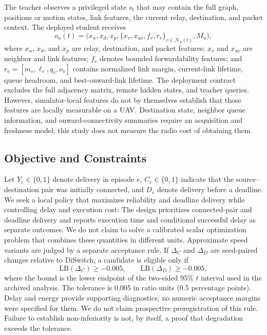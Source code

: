 \documentclass[drones,article,submit,moreauthors]{Definitions/mdpi}
\newcommand{\DS}{DiSwitch}\newcommand{\FastDS}{Fast-DiSwitch}
\begin{document}
The teacher observes a privileged state $s_t$ that may contain the full graph, positions or motion states, link features, the current relay, destination, and packet context. The deployed student receives
\begin{equation}
o_u(t)=\big(x_u, x_d, x_p, \{x_v,x_{uv},f_v,r_v\}_{v\in\mathcal{N}_u(t)},M_u\big),
\end{equation}
where $x_u$, $x_d$, and $x_p$ are relay, destination, and packet features; $x_v$ and $x_{uv}$ are neighbor and link features; $f_v$ denotes bounded forwardability features; and $r_v=[m_v,\ell_v,q_v,o_v]$ contains normalized link margin, current-link lifetime, queue headroom, and best-onward-link lifetime. The deployment contract excludes the full adjacency matrix, remote hidden states, and teacher queries. However, simulator-local features do not by themselves establish that those features are locally measurable on a UAV. Destination state, neighbor queue information, and onward-connectivity summaries require an acquisition and freshness model; this study does not measure the radio cost of obtaining them.

\subsection{Objective and Constraints}

Let $Y_e\in\{0,1\}$ denote delivery in episode $e$, $C_e\in\{0,1\}$ indicate that the source--destination pair was initially connected, and $D_e$ denote delivery before a deadline. We seek a local policy that maximizes reliability and deadline delivery while controlling delay and execution cost:
The design prioritizes connected-pair and deadline delivery and reports execution time and conditional successful delay as separate outcomes. We do not claim to solve a calibrated scalar optimization problem that combines these quantities in different units. Approximate speed variants are judged by a separate acceptance rule. If $\Delta_C$ and $\Delta_D$ are seed-paired changes relative to \DS{}, a candidate is eligible only if
\begin{equation}
\mathrm{LB}(\Delta_C)\geq-0.005,\qquad
\mathrm{LB}(\Delta_D)\geq-0.005,
\label{eq:gate}
\end{equation}
where the bound is the lower endpoint of the two-sided 95\% $t$ interval used in the archived analysis. The tolerance is 0.005 in ratio units (0.5 percentage points). Delay and energy provide supporting diagnostics; no numeric acceptance margins were specified for them. We do not claim prospective preregistration of this rule. Failure to establish non-inferiority is not, by itself, a proof that degradation exceeds the tolerance.
\end{document}
